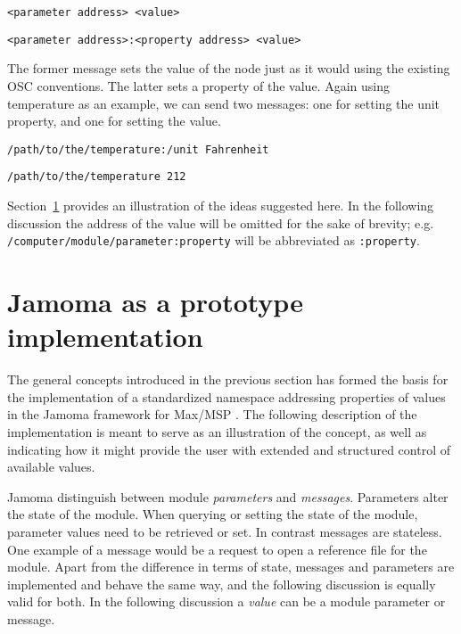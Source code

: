 \documentclass{sig-alternate}
\begin{document}
\texttt{<parameter address> <value>}

\texttt{<parameter address>:<property address> <value>}

The former message sets the value of the node just as it would using the existing OSC conventions. The latter sets a property of the value.  Again using temperature as an example, we can send two messages: one for setting the unit property, and one for setting the value.

\texttt{/path/to/the/temperature:/unit Fahrenheit}

\texttt{/path/to/the/temperature 212}


Section~\ref{sec:prototype_implementation} provides an illustration of the ideas suggested here. In the following discussion the address of the value will be omitted for the sake of brevity; e.g. \texttt{/computer/module/parameter:property} will be abbreviated as \texttt{:property}.







\section{Jamoma as a prototype implementation} %
\label{sec:prototype_implementation}

The general concepts introduced in the previous section has formed the basis for the implementation of a standardized namespace addressing properties of values in the Jamoma framework for Max/MSP \cite{Place:2006}. The following description of the implementation is meant to serve as an illustration of the concept, as well as indicating how it might provide the user with extended and structured control of available values.

Jamoma distinguish between module \emph{parameters} and \emph{messages}. Parameters alter the state of the module. When querying or setting the state of the module, parameter values need to be retrieved or set. In contrast messages are stateless. One example of a message would be a request to open a reference file for the module. Apart from the difference in terms of state, messages and parameters are implemented and behave the same way, and the following discussion is equally valid for both. In the following discussion a \emph{value} can be a module parameter or message.
\end{document}
